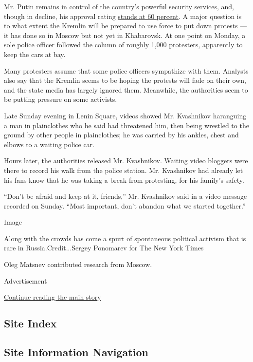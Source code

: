 Mr. Putin remains in control of the country's powerful security
services, and, though in decline, his approval rating
\href{https://www.levada.ru/en/ratings/}{stands at 60 percent}. A major
question is to what extent the Kremlin will be prepared to use force to
put down protests --- it has done so in Moscow but not yet in
Khabarovsk. At one point on Monday, a sole police officer followed the
column of roughly 1,000 protesters, apparently to keep the cars at bay.

Many protesters assume that some police officers sympathize with them.
Analysts also say that the Kremlin seems to be hoping the protests will
fade on their own, and the state media has largely ignored them.
Meanwhile, the authorities seem to be putting pressure on some
activists.

Late Sunday evening in Lenin Square, videos showed Mr. Kvashnikov
haranguing a man in plainclothes who he said had threatened him, then
being wrestled to the ground by other people in plainclothes; he was
carried by his ankles, chest and elbows to a waiting police car.

Hours later, the authorities released Mr. Kvashnikov. Waiting video
bloggers were there to record his walk from the police station. Mr.
Kvashnikov had already let his fans know that he was taking a break from
protesting, for his family's safety.

``Don't be afraid and keep at it, friends,'' Mr. Kvashnikov said in a
video message recorded on Sunday. ``Most important, don't abandon what
we started together.''

Image

Along with the crowds has come a spurt of spontaneous political activism
that is rare in Russia.Credit...Sergey Ponomarev for The New York Times

Oleg Matsnev contributed research from Moscow.

Advertisement

\protect\hyperlink{after-bottom}{Continue reading the main story}

\hypertarget{site-index}{%
\subsection{Site Index}\label{site-index}}

\hypertarget{site-information-navigation}{%
\subsection{Site Information
Navigation}\label{site-information-navigation}}

